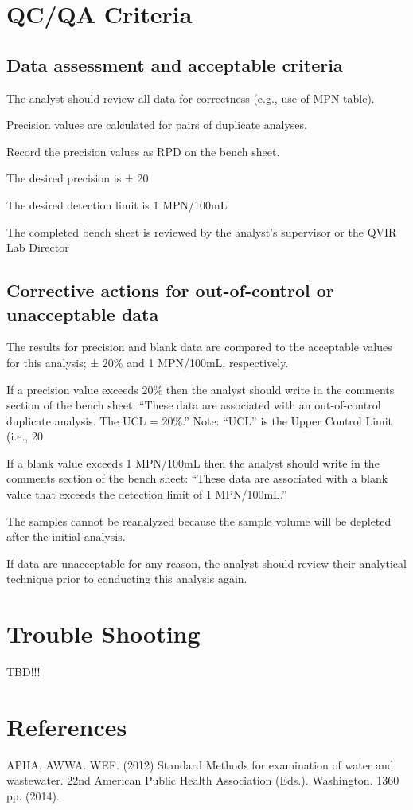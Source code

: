 \documentclass[12pt]{../SOP4_alpha}\usepackage[]{graphicx}\usepackage[]{color}
\begin{document}
\section{QC/QA Criteria}

\subsection{Data assessment and acceptable criteria}

\NP The analyst should review all data for correctness (e.g., use of MPN table).

\NP Precision values are calculated for pairs of duplicate analyses.

\NP Record the precision values as RPD on the bench sheet.

\NP The desired precision is ± 20%

\NP The desired detection limit is 1 MPN/100mL

\NP The completed bench sheet is reviewed by the analyst's supervisor or the
QVIR Lab Director 


\subsection{Corrective actions for out-of-control or unacceptable data}

\NP The results for precision and blank data are compared to the
acceptable values for this analysis; ± 20\% and 1 MPN/100mL,
respectively.

\NP If a precision value exceeds 20\% then the analyst should write in the
comments section of the bench sheet: “These data are associated
with an out-of-control duplicate analysis. The UCL = 20\%.” Note:
“UCL” is the Upper Control Limit (i.e., 20%

\NP If a blank value exceeds 1 MPN/100mL then the analyst should write
in the comments section of the bench sheet: “These data are
associated with a blank value that exceeds the detection limit of 1
MPN/100mL.”

\NP The samples cannot be reanalyzed because the sample volume will be
depleted after the initial analysis.

\NP  If data are unacceptable for any reason, the analyst should review
their analytical technique prior to conducting this analysis again. 

\section{Trouble Shooting}

TBD!!! 


\section{References}

\NP APHA, AWWA. WEF. (2012) Standard Methods for examination of water and wastewater. 22nd American Public Health Association (Eds.). Washington. 1360 pp. (2014).
\end{document}
